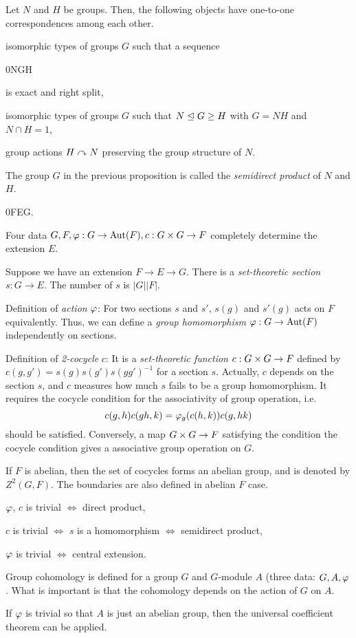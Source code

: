 \documentclass{../exp}
\begin{document}
\begin{prop}
Let $N$ and $H$ be groups.
Then, the following objects have one-to-one correspondences among each other.
\begin{cond}
\item isomorphic types of groups $G$ such that a sequence \begin{es}0\>N\>G\>H\end{es} is exact and right split,
\item isomorphic types of groups $G$ such that $N\trianglelefteq G\ge H$ with $G=NH$ and $N\cap H=1$,
\item group actions $H\curvearrowright N$ preserving the group structure of $N$.
\end{cond}
\end{prop}
\begin{defn}
The group $G$ in the previous proposition is called the \emph{semidirect product} of $N$ and $H$.
\end{defn}


\begin{es}
0\>F\>E\>G.
\end{es}
Four data $G,F,\f:G\to\Aut(F),c:G\x G\to F$ completely determine the extension $E$.

Suppose we have an extension $F\to E\to G$.
There is a \emph{set-theoretic section} $s:G\to E$.
The number of $s$ is $|G||F|$.

Definition of \emph{action} $\varphi$:
For two sections $s$ and $s'$, $s(g)$ and $s'(g)$ acts on $F$ equivalently.
Thus, we can define a \emph{group homomorphism} $\f:G\to\Aut(F)$ independently on sections.

Definition of \emph{2-cocycle} $c$:
It is a \emph{set-theoretic function} $c:G\x G\to F$ defined by $c(g,g')=s(g)s(g')s(gg')^{-1}$ for a section $s$.
Actually, $c$ depends on the section $s$, and $c$ measures how much $s$ fails to be a group homomorphism.
It requires the cocycle condition for the associativity of group operation, i.e.
\[c(g,h)c(gh,k)=\varphi_g(c(h,k))c(g,hk)\]
should be satisfied.
Conversely, a map $G\x G\to F$ satisfying the condition the cocycle condition gives a associative group operation on $G$.

If $F$ is abelian, then the set of cocycles forms an abelian group, and is denoted by $Z^2(G,F)$.
The boundaries are also defined in abelian $F$ case.


\begin{cond}
\item $\varphi$, $c$ is trivial $\iff$ direct product,
\item $c$ is trivial $\iff$ $s$ is a homomorphism $\iff$ semidirect product,
\item $\varphi$ is trivial $\iff$ central extension.
\end{cond}

Group cohomology is defined for a group $G$ and $G$-module $A$ (three data: $G,A,\varphi$.
What is important is that the cohomology depends on the action of $G$ on $A$.

If $\varphi$ is trivial so that $A$ is just an abelian group, then the universal coefficient theorem can be applied.
\end{document}
